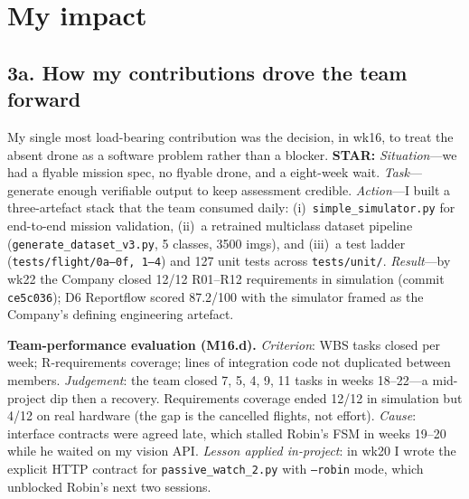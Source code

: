 \section{My impact}

\subsection*{3a. How my contributions drove the team forward }
\www My single most load-bearing contribution was the decision, in wk16, to treat the absent drone as a software problem rather than a blocker. \textbf{STAR:} \emph{Situation}---we had a flyable mission spec, no flyable drone, and a eight-week wait. \emph{Task}---generate enough verifiable output to keep assessment credible. \emph{Action}---I built a three-artefact stack that the team consumed daily: (i)~\texttt{simple\_simulator.py} for end-to-end mission validation, (ii)~a retrained multiclass dataset pipeline (\texttt{generate\_dataset\_v3.py}, 5 classes, 3500 imgs), and (iii)~a test ladder (\texttt{tests/flight/0a--0f, 1--4}) and 127 unit tests across \texttt{tests/unit/}. \emph{Result}---by wk22 the Company closed 12/12 R01--R12 requirements in simulation (commit \texttt{ce5c036}); D6 Reportflow scored 87.2/100 with the simulator framed as the Company's defining engineering artefact.

\www \textbf{Team-performance evaluation (M16.d).} \emph{Criterion}: WBS tasks closed per week; R-requirements coverage; lines of integration code not duplicated between members. \emph{Judgement}: the team closed 7, 5, 4, 9, 11 tasks in weeks 18--22---a mid-project dip then a recovery. Requirements coverage ended 12/12 in simulation but 4/12 on real hardware (the gap is the cancelled flights, not effort). \emph{Cause}: interface contracts were agreed late, which stalled Robin's FSM in weeks 19--20 while he waited on my vision API. \emph{Lesson applied in-project}: in wk20 I wrote the explicit HTTP contract for \texttt{passive\_watch\_2.py} with \texttt{--robin} mode, which unblocked Robin's next two sessions.

